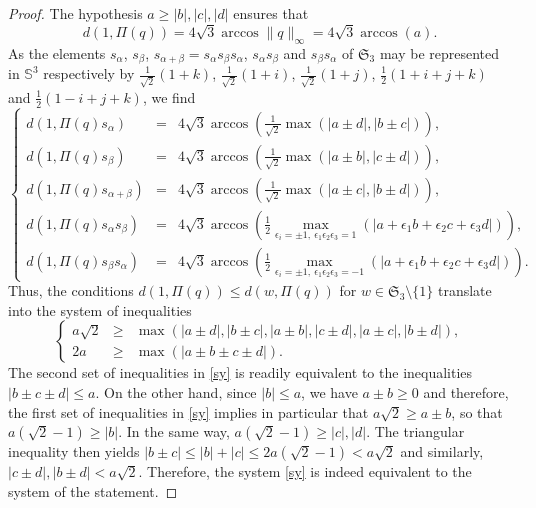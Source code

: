 \documentclass[10pt,a4paper]{amsart}
\newcommand{\Sph}{\mathbb{S}}
\newcommand{\Sym}{\mathfrak{S}}
\begin{document}
\begin{proof}
The hypothesis $a\ge|b|,|c|,|d|$ ensures that
\[d(1,\Pi(q))=4\sqrt{3}\arccos\|q\|_\infty=4\sqrt{3}\arccos(a).\]
As the elements $s_\alpha$, $s_\beta$, $s_{\alpha+\beta}=s_\alpha s_\beta s_\alpha$, $s_\alpha s_\beta$ and $s_\beta s_\alpha$ of $\Sym_3$ may be represented in $\Sph^3$ respectively by $\tfrac{1}{\sqrt{2}}(1+k)$, $\tfrac{1}{\sqrt{2}}(1+i)$, $\tfrac{1}{\sqrt{2}}(1+j)$, $\tfrac12(1+i+j+k)$ and $\tfrac12(1-i+j+k)$, we find
\[\left\{\begin{array}{rcl}
d(1,\Pi(q)s_\alpha) & = & 4\sqrt{3}\arccos\left(\tfrac{1}{\sqrt{2}}\max(|a\pm d|,|b\pm c|)\right), \\[.5em]
d(1,\Pi(q)s_\beta) & = & 4\sqrt{3}\arccos\left(\tfrac{1}{\sqrt{2}}\max(|a\pm b|,|c\pm d|)\right), \\[.5em]
d(1,\Pi(q)s_{\alpha+\beta}) & = & 4\sqrt{3}\arccos\left(\tfrac{1}{\sqrt{2}}\max(|a\pm c|,|b\pm d|)\right), \\[.5em]
d(1,\Pi(q)s_\alpha s_\beta) & = & 4\sqrt{3}\arccos\left(\tfrac12\max_{\epsilon_i=\pm1,~\epsilon_1\epsilon_2\epsilon_3=1}(|a+\epsilon_1b+\epsilon_2c+\epsilon_3d|)\right), \\[.5em]
d(1,\Pi(q)s_\beta s_\alpha) & = & 4\sqrt{3}\arccos\left(\tfrac12\max_{\epsilon_i=\pm1,~\epsilon_1\epsilon_2\epsilon_3=-1}(|a+\epsilon_1b+\epsilon_2c+\epsilon_3d|)\right).\end{array}\right.\]
Thus, the conditions $d(1,\Pi(q))\le d(w,\Pi(q))$ for $w\in\Sym_3\setminus\{1\}$ translate into the system of inequalities
\begin{equation}\label{sy}\tag{$S$}
\left\{\begin{array}{rcl}
a\sqrt{2} & \ge & \max(|a\pm d|,|b\pm c|,|a\pm b|,|c\pm d|,|a\pm c|,|b\pm d|), \\[.5em]
2a & \ge & \max(|a\pm b\pm c\pm d|).\end{array}\right.
\end{equation}
The second set of inequalities in \eqref{sy} is readily equivalent to the inequalities $|b\pm c\pm d|\le a$. On the other hand, since $|b|\le a$, we have $a\pm b\ge 0$ and therefore, the first set of inequalities in \eqref{sy} implies in particular that $a\sqrt{2}\ge a\pm b$, so that $a(\sqrt{2}-1)\ge |b|$. In the same way, $a(\sqrt{2}-1)\ge |c|,|d|$. The triangular inequality then yields $|b\pm c|\le|b|+|c|\le 2a(\sqrt{2}-1)<a\sqrt{2}$ and similarly, $|c\pm d|,|b\pm d|<a\sqrt{2}$. Therefore, the system \eqref{sy} is indeed equivalent to the system of the statement.


\end{proof}
\end{document}
